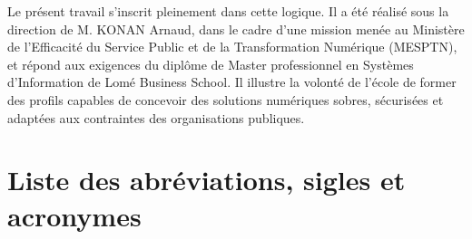 \documentclass[12pt,a4paper]{report}
\newcommand{\nomMinistere}{Ministère de l'Efficacité du Service Public et de la Transformation Numérique (MESPTN)}
\begin{document}
Le présent travail s'inscrit pleinement dans cette logique. Il a été réalisé sous la direction de M. KONAN Arnaud, dans le cadre d'une mission menée au \nomMinistere{}, et répond aux exigences du diplôme de Master professionnel en Systèmes d'Information de Lomé Business School. Il illustre la volonté de l'école de former des profils capables de concevoir des solutions numériques sobres, sécurisées et adaptées aux contraintes des organisations publiques.

\clearpage
\listoffigures
\clearpage
\listoftables
\clearpage

\chapter*{Liste des abréviations, sigles et acronymes}
\end{document}
